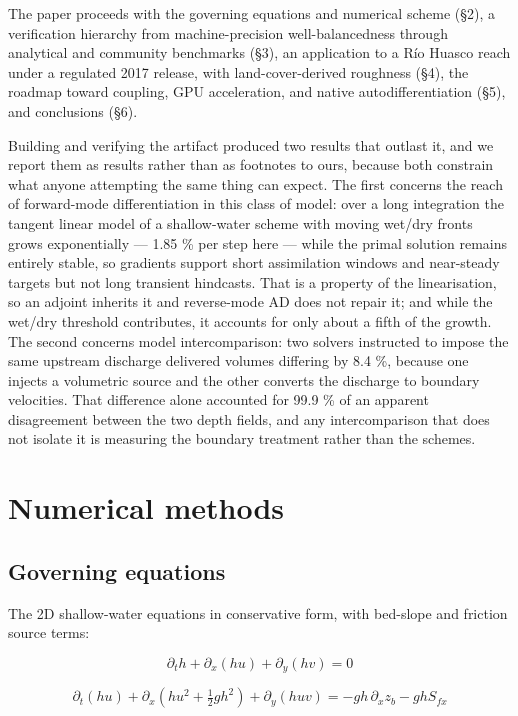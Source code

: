 The paper proceeds with the governing equations and numerical scheme
(§2), a verification hierarchy from machine-precision well-balancedness
through analytical and community benchmarks (§3), an application to a
Río Huasco reach under a regulated 2017 release, with land-cover-derived
roughness (§4), the roadmap toward coupling, GPU acceleration, and
native autodifferentiation (§5), and conclusions (§6).

Building and verifying the artifact produced two results that outlast
it, and we report them as results rather than as footnotes to ours,
because both constrain what anyone attempting the same thing can expect.
The first concerns the reach of forward-mode differentiation in this
class of model: over a long integration the tangent linear model of a
shallow-water scheme with moving wet/dry fronts grows exponentially ---
1.85 \% per step here --- while the primal solution remains entirely
stable, so gradients support short assimilation windows and near-steady
targets but not long transient hindcasts. That is a property of the
linearisation, so an adjoint inherits it and reverse-mode AD does not
repair it; and while the wet/dry threshold contributes, it accounts for
only about a fifth of the growth. The second concerns model
intercomparison: two solvers instructed to impose the same upstream
discharge delivered volumes differing by 8.4 \%, because one injects a
volumetric source and the other converts the discharge to boundary
velocities. That difference alone accounted for 99.9 \% of an apparent
disagreement between the two depth fields, and any intercomparison that
does not isolate it is measuring the boundary treatment rather than the
schemes.

\section{Numerical methods}

\subsection{Governing equations}

The 2D shallow-water equations in conservative form, with bed-slope and
friction source terms:

\[\partial_t h + \partial_x (hu) + \partial_y (hv) = 0\]

\[\partial_t (hu) + \partial_x\!\left(hu^2 + \tfrac{1}{2}g h^2\right) + \partial_y (huv) = -g h\, \partial_x z_b - g h S_{fx}\]


